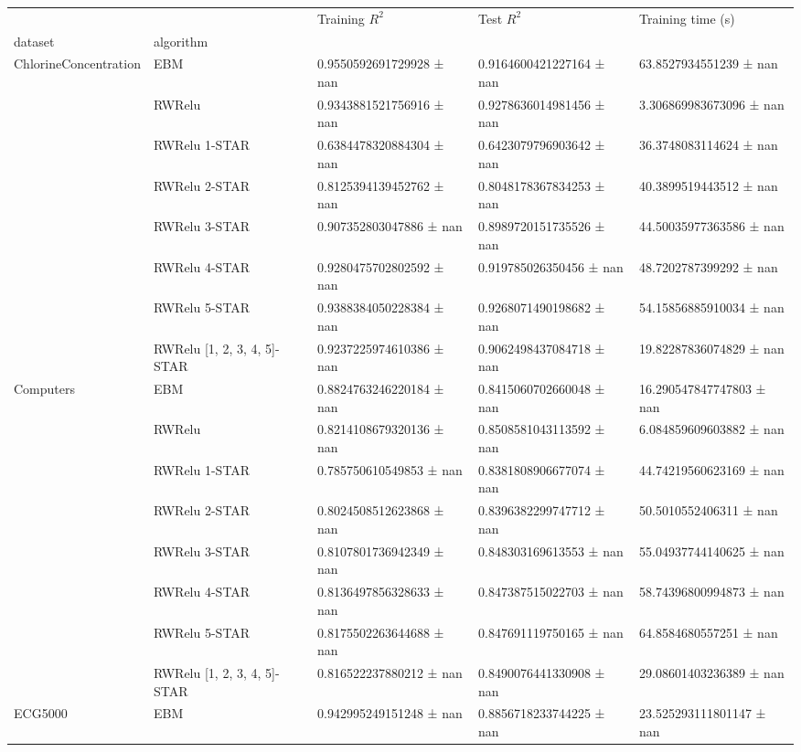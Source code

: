 \begin{tabular}{lllll}
\toprule
 &  & Training $R^2$ & Test $R^2$ & Training time (s) \\
dataset & algorithm &  &  &  \\
\midrule
\multirow[t]{8}{*}{ChlorineConcentration} & EBM & 0.9550592691729928 ± nan & 0.9164600421227164 ± nan & 63.8527934551239 ± nan \\
 & RWRelu & 0.9343881521756916 ± nan & 0.9278636014981456 ± nan & 3.306869983673096 ± nan \\
 & RWRelu 1-STAR & 0.6384478320884304 ± nan & 0.6423079796903642 ± nan & 36.3748083114624 ± nan \\
 & RWRelu 2-STAR & 0.8125394139452762 ± nan & 0.8048178367834253 ± nan & 40.3899519443512 ± nan \\
 & RWRelu 3-STAR & 0.907352803047886 ± nan & 0.8989720151735526 ± nan & 44.50035977363586 ± nan \\
 & RWRelu 4-STAR & 0.9280475702802592 ± nan & 0.919785026350456 ± nan & 48.7202787399292 ± nan \\
 & RWRelu 5-STAR & 0.9388384050228384 ± nan & 0.9268071490198682 ± nan & 54.15856885910034 ± nan \\
 & RWRelu [1, 2, 3, 4, 5]-STAR & 0.9237225974610386 ± nan & 0.9062498437084718 ± nan & 19.82287836074829 ± nan \\
\cline{1-5}
\multirow[t]{8}{*}{Computers} & EBM & 0.8824763246220184 ± nan & 0.8415060702660048 ± nan & 16.290547847747803 ± nan \\
 & RWRelu & 0.8214108679320136 ± nan & 0.8508581043113592 ± nan & 6.084859609603882 ± nan \\
 & RWRelu 1-STAR & 0.785750610549853 ± nan & 0.8381808906677074 ± nan & 44.74219560623169 ± nan \\
 & RWRelu 2-STAR & 0.8024508512623868 ± nan & 0.8396382299747712 ± nan & 50.5010552406311 ± nan \\
 & RWRelu 3-STAR & 0.8107801736942349 ± nan & 0.848303169613553 ± nan & 55.04937744140625 ± nan \\
 & RWRelu 4-STAR & 0.8136497856328633 ± nan & 0.847387515022703 ± nan & 58.74396800994873 ± nan \\
 & RWRelu 5-STAR & 0.8175502263644688 ± nan & 0.847691119750165 ± nan & 64.8584680557251 ± nan \\
 & RWRelu [1, 2, 3, 4, 5]-STAR & 0.816522237880212 ± nan & 0.8490076441330908 ± nan & 29.08601403236389 ± nan \\
\cline{1-5}
\multirow[t]{8}{*}{ECG5000} & EBM & 0.942995249151248 ± nan & 0.8856718233744225 ± nan & 23.525293111801147 ± nan \\

\end{tabular}
